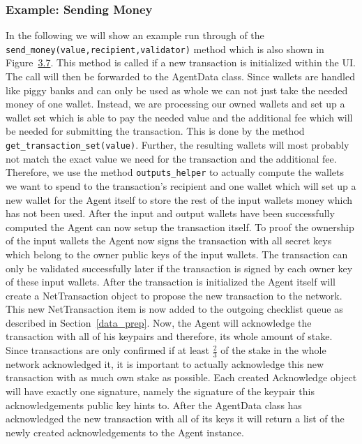 \subsubsection{Example: Sending Money}
In the following we will show an example run through of the \\
\texttt{send\_money(value,recipient,validator)} method which is also shown in \\Figure~\hyperref[send_money]{3.7}.
This method is called if a new transaction is initialized within the UI.
The call will then be forwarded to the AgentData class.
Since wallets are handled like piggy banks and can only be used as whole we can not just take the needed money of one wallet.
Instead, we are processing our owned wallets and set up a wallet set which is able to pay the needed value and the additional fee which will be needed for submitting the transaction.
This is done by the method \texttt{get\_transaction\_set(value)}.
Further, the resulting wallets will most probably not match the exact value we need for the transaction and the additional fee.
Therefore, we use the method \texttt{outputs\_helper} to actually compute the wallets we want to spend to the transaction's recipient and one wallet which will set up a new wallet for the Agent itself to store the rest of the input wallets money which has not been used.
After the input and output wallets have been successfully computed the Agent can now setup the transaction itself.
To proof the ownership of the input wallets the Agent now signs the transaction with all secret keys which belong to the owner public keys of the input wallets.
The transaction can only be validated successfully later if the transaction is signed by each owner key of these input wallets.
After the transaction is initialized the Agent itself will create a NetTransaction object to propose the new transaction to the network.
This new NetTransaction item is now added to the outgoing checklist queue as described in Section~\ref{data_prep}.
Now, the Agent will acknowledge the transaction with all of his keypairs and therefore, its whole amount of stake.
Since transactions are only confirmed if at least $\frac{2}{3}$ of the stake in the whole network acknowledged it, it is important to actually acknowledge this new transaction with as much own stake as possible.
Each created Acknowledge object will have exactly one signature, namely the signature of the keypair this acknowledgements public key hints to.
After the AgentData class has acknowledged the new transaction with all of its keys it will return a list of the newly created acknowledgements to the Agent instance.
